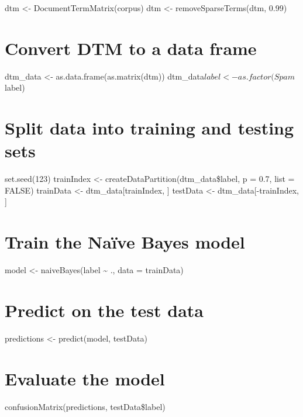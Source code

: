 \documentclass[
]{article}
\begin{document}
dtm \textless- DocumentTermMatrix(corpus) dtm \textless-
removeSparseTerms(dtm, 0.99)

\section{Convert DTM to a data frame}\label{convert-dtm-to-a-data-frame}

dtm\_data \textless- as.data.frame(as.matrix(dtm))
dtm\_data\(label <- as.factor(Spam\)label)

\section{Split data into training and testing
sets}\label{split-data-into-training-and-testing-sets}

set.seed(123) trainIndex \textless-
createDataPartition(dtm\_data\$label, p = 0.7, list = FALSE) trainData
\textless- dtm\_data{[}trainIndex, {]} testData \textless-
dtm\_data{[}-trainIndex, {]}

\section{Train the Naïve Bayes
model}\label{train-the-nauxefve-bayes-model}

model \textless- naiveBayes(label \textasciitilde{} ., data = trainData)

\section{Predict on the test data}\label{predict-on-the-test-data}

predictions \textless- predict(model, testData)

\section{Evaluate the model}\label{evaluate-the-model}

confusionMatrix(predictions, testData\$label)
\end{document}
